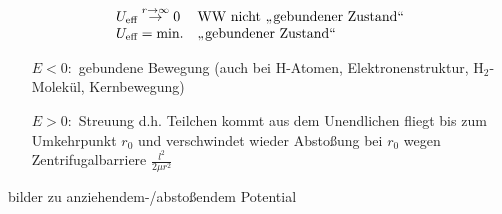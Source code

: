 \documentclass[titlepage,12pt,a4paper,ngerman]{report}
\newcommand{\tx}[1]{\textrm{#1}}
\begin{document}
{\begin{itemize}
$$\begin{array}{ll}
	U_{\tx{eff}} \buildrel r \rightarrow \infty \over \rightarrow 0 & \tx{WW nicht ,,gebundener Zustand``} \\
	U_{\tx{eff}} = \tx{min.} & \tx{,,gebundener Zustand``}
	\end{array}$$
	\begin{itemize}
		\item[$ E<0: $] gebundene Bewegung (auch bei H-Atomen, Elektronenstruktur, $ \tx{H}_2 $-Molekül, Kernbewegung)
		\item[$ E>0: $] Streuung d.h. Teilchen kommt aus dem Unendlichen fliegt bis zum Umkehrpunkt $ r_0 $ und verschwindet wieder Abstoßung bei $ r_0 $ wegen Zentrifugalbarriere $ \frac{l^2}{2 \mu r^2} $
	\end{itemize}
	
	bilder zu anziehendem-/abstoßendem Potential
\end{itemize}
}
\end{document}
